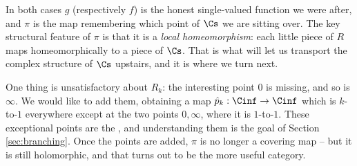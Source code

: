 \begin{center}
\end{center}

In both cases $g$ (respectively $f$) is the honest single-valued function we were after,
and $\pi$ is the map remembering which point of $\Cs$ we are sitting over. The key
structural feature of $\pi$ is that it is a \emph{local homeomorphism}: each little piece
of $R$ maps homeomorphically to a piece of $\Cs$. That is what will let us transport the
complex structure of $\Cs$ upstairs, and it is where we turn next.

\begin{remark}
	One thing is unsatisfactory about $R_k$: the interesting point $0$ is missing, and so
	is $\infty$. We would like to add them, obtaining a map
	$\hat{p}_k : \Cinf \to \Cinf$ which is $k$-to-$1$ everywhere except at the two points
	$0, \infty$, where it is $1$-to-$1$. These exceptional points are the , and understanding them is the goal of Section \ref{sec:branching}. Once the
	points are added, $\pi$ is no longer a covering map -- but it is still holomorphic, and
	that turns out to be the more useful category.
\end{remark}

